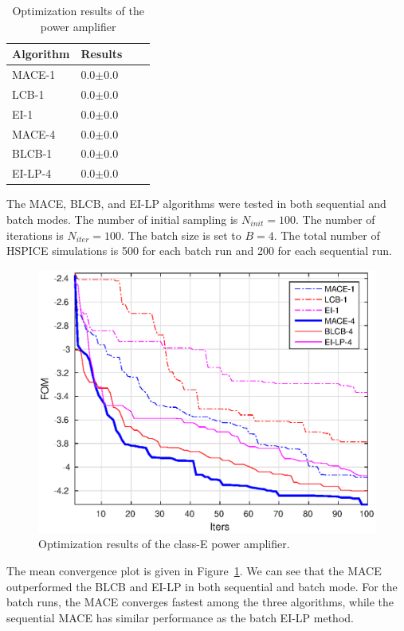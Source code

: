 \begin{table}[htbp]
    \centering
    \caption{Optimization results of the power amplifier}
    \label{tab:result_PA}
    \begin{tabular}{llll}
        \toprule
        Algorithm & Results     \\ \midrule
        MACE-1    & 0.0$\pm$0.0 \\
        LCB-1     & 0.0$\pm$0.0 \\
        EI-1      & 0.0$\pm$0.0 \\
        MACE-4    & 0.0$\pm$0.0 \\
        BLCB-1    & 0.0$\pm$0.0 \\
        EI-LP-4   & 0.0$\pm$0.0 \\
        \bottomrule
    \end{tabular}
\end{table}

The MACE, BLCB, and EI-LP algorithms were tested in both sequential and batch
modes. The number of initial sampling is $N_{init} = 100$. The number of
iterations is $N_{iter} = 100$. The batch size is set to $B = 4$. The total
number of HSPICE simulations is 500 for each batch run and 200 for each
sequential run.


\begin{figure}[htbp]
\vskip 0.2in
\begin{center}
\centerline{\includegraphics[width=\columnwidth]{./img/ClassE_mean.eps}}
\caption{Optimization results of the class-E power amplifier.}
\label{fig:resClassE}
\end{center}
\vskip -0.2in
\end{figure}

The mean convergence plot is given in Figure~\ref{fig:resClassE}. We can see
that the MACE outperformed the BLCB and EI-LP in both sequential and batch
mode. For the batch runs, the MACE converges fastest among the three
algorithms, while the sequential MACE has similar performance as the batch
EI-LP method.

